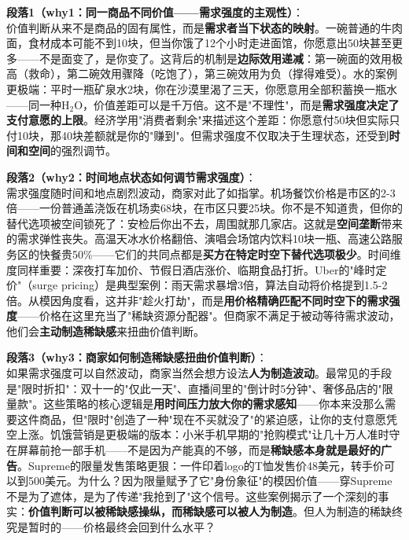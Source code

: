 \documentclass[../main.tex]{subfiles}
\begin{document}
	\textbf{段落1（why1：同一商品不同价值——需求强度的主观性）}：\\
	价值判断从来不是商品的固有属性，而是\textbf{需求者当下状态的映射}。一碗普通的牛肉面，食材成本可能不到10块，但当你饿了12个小时走进面馆，你愿意出50块甚至更多——不是面变了，是你变了。这背后的机制是\textbf{边际效用递减}：第一碗面的效用极高（救命），第二碗效用骤降（吃饱了），第三碗效用为负（撑得难受）。水的案例更极端：平时一瓶矿泉水2块，你在沙漠里渴了三天，你愿意用全部积蓄换一瓶水——同一种H$_2$O，价值差距可以是千万倍。这不是"不理性"，而是\textbf{需求强度决定了支付意愿的上限}。经济学用"消费者剩余"来描述这个差距：你愿意付50块但实际只付10块，那40块差额就是你的"赚到"。但需求强度不仅取决于生理状态，还受到\textbf{时间和空间}的强烈调节。

	\textbf{段落2（why2：时间地点状态如何调节需求强度）}：\\
	需求强度随时间和地点剧烈波动，商家对此了如指掌。机场餐饮价格是市区的2-3倍——一份普通盖浇饭在机场卖68块，在市区只要25块。你不是不知道贵，但你的替代选项被空间锁死了：安检后你出不去，周围就那几家店。这就是\textbf{空间垄断}带来的需求弹性丧失。高温天冰水价格翻倍、演唱会场馆内饮料10块一瓶、高速公路服务区的快餐贵50\%——它们的共同点都是\textbf{买方在特定时空下替代选项极少}。时间维度同样重要：深夜打车加价、节假日酒店涨价、临期食品打折。Uber的"峰时定价"（surge pricing）是典型案例：雨天需求暴增3倍，算法自动将价格提到1.5-2倍。从模因角度看，这并非"趁火打劫"，而是\textbf{用价格精确匹配不同时空下的需求强度}——价格在这里充当了"稀缺资源分配器"。但商家不满足于被动等待需求波动，他们会\textbf{主动制造稀缺感}来扭曲价值判断。

	\textbf{段落3（why3：商家如何制造稀缺感扭曲价值判断）}：\\
	如果需求强度可以自然波动，商家当然会想方设法\textbf{人为制造波动}。最常见的手段是"限时折扣"：双十一的"仅此一天"、直播间里的"倒计时5分钟"、奢侈品店的"限量款"。这些策略的核心逻辑是\textbf{用时间压力放大你的需求感知}——你本来没那么需要这件商品，但"限时"创造了一种"现在不买就没了"的紧迫感，让你的支付意愿凭空上涨。饥饿营销是更极端的版本：小米手机早期的"抢购模式"让几十万人准时守在屏幕前抢一部手机——不是因为产能真的不够，而是\textbf{稀缺感本身就是最好的广告}。Supreme的限量发售策略更狠：一件印着logo的T恤发售价48美元，转手价可以到500美元。为什么？因为限量赋予了它"身份象征"的模因价值——穿Supreme不是为了遮体，是为了传递"我抢到了"这个信号。这些案例揭示了一个深刻的事实：\textbf{价值判断可以被稀缺感操纵，而稀缺感可以被人为制造}。但人为制造的稀缺终究是暂时的——价格最终会回到什么水平？
\end{document}
